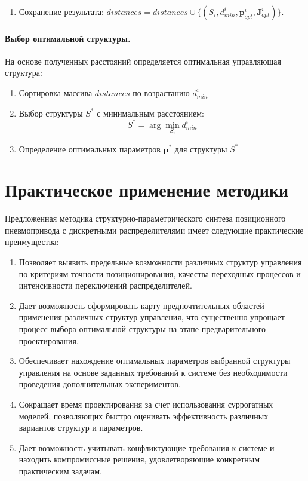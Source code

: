 \begin{enumerate}
    \item Сохранение результата: $distances = distances \cup \{(S_i, d_{min}^i, \mathbf{p}_{opt}^i, \mathbf{J}_{opt}^i)\}.$
\end{enumerate}

\paragraph*{Выбор оптимальной структуры.}

На основе полученных расстояний определяется оптимальная управляющая структура:

\begin{enumerate}
    \item Сортировка массива $distances$ по возрастанию $d_{min}^i$
    \item Выбор структуры $S^*$ с минимальным расстоянием:
          \begin{equation}
              S^* = \arg\min_{S_i} d_{min}^i
          \end{equation}
    \item Определение оптимальных параметров $\mathbf{p}^*$ для структуры $S^*$
\end{enumerate}

\section*{Практическое применение методики}

Предложенная методика структурно-параметрического синтеза позиционного
пневмопривода с дискретными распределителями имеет следующие практические преимущества:

\begin{enumerate}
    \item Позволяет выявить предельные возможности различных структур
	управления по критериям точности позиционирования, качества
	переходных процессов и интенсивности переключений распределителей.

    \item Дает возможность сформировать карту предпочтительных областей
	применения различных структур управления, что существенно упрощает
	процесс выбора оптимальной структуры на этапе предварительного проектирования.

    \item Обеспечивает нахождение оптимальных параметров выбранной структуры
	управления на основе заданных требований к системе без необходимости
	проведения дополнительных экспериментов.

    \item Сокращает время проектирования за счет использования суррогатных
	моделей, позволяющих быстро оценивать эффективность различных вариантов
	структур и параметров.

    \item Дает возможность учитывать конфликтующие требования к системе
	и находить компромиссные решения, удовлетворяющие конкретным
	практическим задачам.
\end{enumerate}

